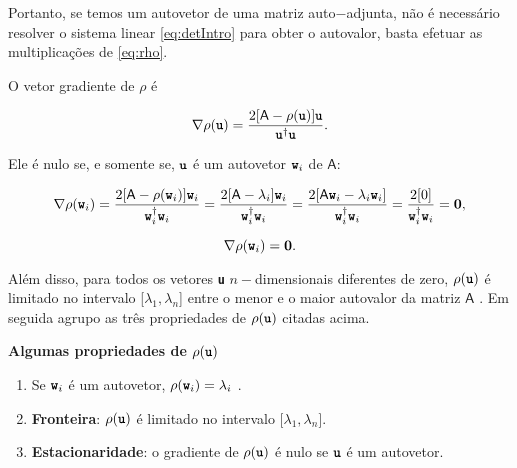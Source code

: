 	Portanto, se temos um autovetor de uma matriz auto$-$adjunta, não é necessário resolver o sistema linear \ref{eq:detIntro} para obter o autovalor, basta efetuar as multiplicações de \ref{eq:rho}.
	
	O vetor gradiente de $\rho$ é \cite{Wilkinson1965}
	
	\begin{equation}\label{eq:gradrho}
		\nabla \rho (\textbf{\texttt{u}}) = \frac{2[\mathsf{A} - \rho(\textbf{\texttt{u}})] \textbf{\texttt{u}}}{\textbf{\texttt{u}}^\dag \textbf{\texttt{u}}}.
	\end{equation}

	Ele é nulo se, e somente se, $\textbf{\texttt{u}}$ é um autovetor $\textbf{\texttt{w}}_i$  de $\mathsf{A}$:
	
	\begin{equation}\label{eq:grad_rho_no_w}
		\nabla \rho (\textbf{\texttt{w}}_i) = \frac{2[\mathsf{A} - \rho(\textbf{\texttt{w}}_i)] \textbf{\texttt{w}}_i}{\textbf{\texttt{w}}_i^\dag \textbf{\texttt{w}}_i} = \frac{2[\mathsf{A} - \lambda_i]\textbf{\texttt{w}}_i}{\textbf{\texttt{w}}_i^\dag \textbf{\texttt{w}}_i} = \frac{2[\mathsf{A}\textbf{\texttt{w}}_i - \lambda_i\textbf{\texttt{w}}_i]}{\textbf{\texttt{w}}_i^\dag \textbf{\texttt{w}}_i} = \frac{2[0]}{\textbf{\texttt{w}}_i^\dag \textbf{\texttt{w}}_i} = \textbf{0},
	\end{equation}
	
	\begin{equation}\label{eq:grad_rho_nulo}
		\nabla \rho (\textbf{\texttt{w}}_i) = \textbf{0}.
	\end{equation}

Além disso, para todos os vetores \textbf{\texttt{u}} $n-$dimensionais diferentes de zero, $\rho(\textbf{\texttt{u}})$ é limitado no intervalo [$\lambda_1, \lambda_n$] entre o menor e o maior autovalor da matriz $\mathsf{A}$ \cite{Parlett1998}. Em seguida agrupo as três propriedades de $\rho(\textbf{\texttt{u}})$ citadas acima.

\textbf{Algumas propriedades de $\rho(\textbf{\texttt{u}})$}

\begin{enumerate}
		
	\item Se $\textbf{\texttt{w}}_i$ é um autovetor, $\rho(\textbf{\texttt{w}}_i) = \lambda_i$ .
	
	\item \textbf{Fronteira}: $\rho(\textbf{\texttt{u}})$ é limitado no intervalo [$\lambda_1, \lambda_n$].
	
	\item \textbf{Estacionaridade}: o gradiente de $\rho(\textbf{\texttt{u}})$ é nulo se $\textbf{\texttt{u}}$ é um autovetor.
	
\end{enumerate}

